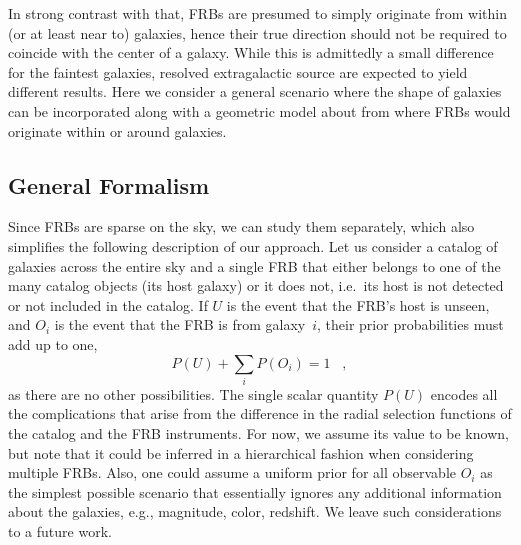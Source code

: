 \documentclass[twocolumn,linenumbers]{aastex63}
\newcommand{\mPOi}{P(O_i)}  %
\newcommand{\mPU}{P(U)}  %
\begin{document}
In strong contrast with that, FRBs are presumed
to simply originate from within (or at least near to)
galaxies, hence their true direction should not be required to coincide with the center of a galaxy. While this is admittedly a small difference for the faintest galaxies, resolved extragalactic source are expected to yield different results.
%
Here we consider a general scenario where the shape of galaxies can be incorporated along with a geometric model about from where FRBs would originate within 
or around galaxies. 


\subsection{General Formalism} 

Since FRBs are sparse on the sky, we can study them separately, which also simplifies the following description of our approach. 
Let us consider a catalog of galaxies across the entire sky and a single FRB that either belongs to one of the many catalog objects (its host galaxy) or it does not, i.e.\ its host is not detected or not included in the catalog. 
If $U$ is the event that the FRB's host is unseen, and $O_i$ is the event that the FRB is from galaxy~$i$, their prior probabilities must add up to one,
%
\begin{equation}
\mPU +  \sum\limits_i \mPOi = 1 \;\;\; ,
\label{eqn:norm}
\end{equation}
%
as there are no other possibilities.
%
The single scalar quantity $P(U)$ encodes all the complications that arise from the difference in the radial selection functions of the catalog and the FRB instruments. For now, we assume its value to be known, but note that it could be inferred in a hierarchical fashion when considering multiple FRBs.
%
Also, one could assume a uniform prior for all observable $O_i$ as the simplest possible scenario that essentially ignores any additional information about the galaxies, e.g., magnitude, color, redshift. We leave such considerations to a future work.
\end{document}
